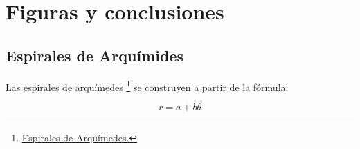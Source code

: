 \documentclass[a4paper,12pt]{article}
\begin{document}
    \newpage
    
    \section{Figuras y conclusiones}
    
    \subsection{Espirales de Arquímides}
    
    Las espirales de arquímedes \footnote{\textcolor{blueMacc}{\underline{\href{https://es.wikipedia.org/wiki/Espiral_de_Arqu\%C3\%ADmedes}{Espirales de Arquímedes.}}}} se construyen a partir de la fórmula: 
    
    \begin{equation*}
        r = a + b\theta
    \end{equation*}
    
\end{document}
